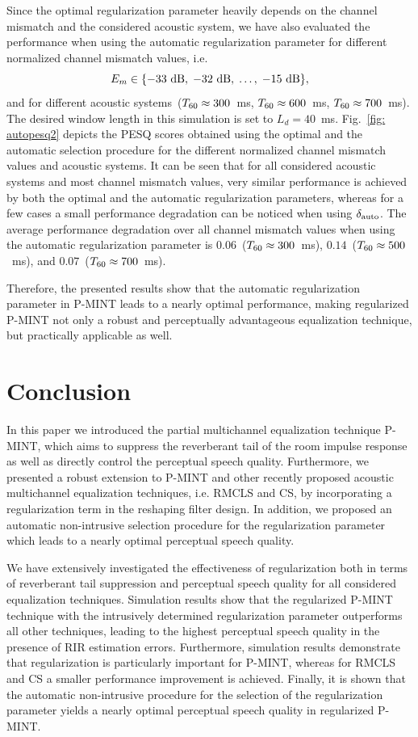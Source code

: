 \documentclass[10pt]{IEEEtran}
\begin{document}
Since the optimal regularization parameter heavily depends on the channel mismatch and the considered acoustic system, we have also evaluated the performance when using the automatic regularization parameter for different normalized channel mismatch values, i.e.
\begin{equation}
  E_m \in \{ -33~{\rm dB}, \; -32~{\rm dB}, \; \ldots, \; -15~{\rm dB} \},
\end{equation}
and for different acoustic systems~($T_{\rm 60} \approx 300$~ms, $T_{\rm 60} \approx 600$~ms, $T_{\rm 60} \approx 700$~ms).
The desired window length in this simulation is set to $L_d = 40$~ms.
Fig.~\ref{fig: autopesq2} depicts the PESQ scores obtained using the optimal and the automatic selection procedure for the different normalized channel mismatch values and acoustic systems.
It can be seen that for all considered acoustic systems and most channel mismatch values, very similar performance is achieved by both the optimal and the automatic regularization parameters, whereas for a few cases a small performance degradation can be noticed when using $\delta_{\rm auto}$.
The average performance degradation over all channel mismatch values when using the automatic regularization parameter is $0.06$~($T_{\rm 60} \approx 300$~ms), $0.14$~($T_{\rm 60} \approx 500$~ms), and $0.07$~($T_{\rm 60} \approx 700$~ms).

Therefore, the presented results show that the automatic regularization parameter in P-MINT leads to a nearly optimal performance, making regularized P-MINT not only a robust and perceptually advantageous equalization technique, but practically applicable as well.


\section{Conclusion}
In this paper we introduced the partial multichannel equalization technique P-MINT, which aims to suppress the reverberant tail of the room impulse response as well as directly control the perceptual speech quality.
Furthermore, we presented a robust extension to P-MINT and other recently proposed acoustic multichannel equalization techniques, i.e. RMCLS and CS, by incorporating a regularization term in the reshaping filter design.
In addition, we proposed an automatic non-intrusive selection procedure for the regularization parameter which leads to a nearly optimal perceptual speech quality.

We have extensively investigated the effectiveness of regularization both in terms of reverberant tail suppression and perceptual speech quality for all considered equalization techniques.
Simulation results show that the regularized P-MINT technique with the intrusively determined regularization parameter outperforms all other techniques, leading to the highest perceptual speech quality in the presence of RIR estimation errors.
Furthermore, simulation results demonstrate that regularization is particularly important for P-MINT, whereas for RMCLS and CS a smaller performance improvement is achieved.
Finally, it is shown that the automatic non-intrusive procedure for the selection of the regularization parameter yields a nearly optimal perceptual speech quality in regularized P-MINT.
\end{document}
